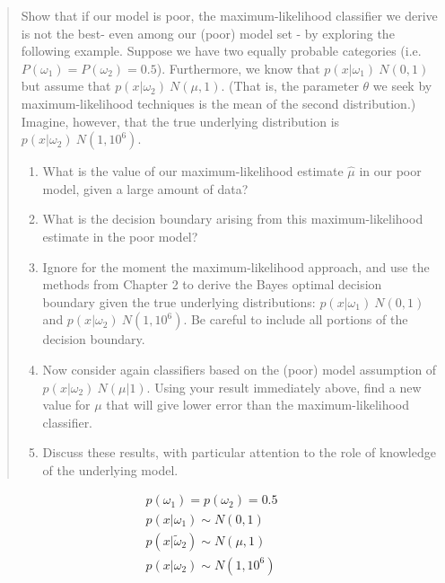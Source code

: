 \documentclass[11pt]{article}
\begin{document}
\begin{quote}
Show that if our model is poor, the maximum-likelihood classifier we derive is not the best- even among our (poor) model set - by exploring the following example.  Suppose we have two equally probable categories (i.e. $P(\omega_1) = P(\omega_2) = 0.5$).  Furthermore, we know that $p(x | \omega_1) ~ N(0,1)$ but assume that $p(x |\omega_2) ~ N(\mu , 1)$.  (That is, the parameter $\theta$ we seek by maximum-likelihood techniques is the mean of the second distribution.)  Imagine, however, that the true underlying distribution is $p(x| \omega_2) ~N(1, 10^6)$.
\begin{enumerate}
	\item What is the value of our maximum-likelihood estimate $\hat{\mu}$ in our poor model, given a large amount of data?
	\item What is the decision boundary arising from this maximum-likelihood estimate in the poor model?  
	\item Ignore for the moment the maximum-likelihood approach, and use the methods from Chapter 2 to derive the Bayes optimal decision boundary given the true underlying distributions: $p(x|\omega_1) ~ N(0,1 )$ and $p(x | \omega_2) ~N(1, 10^6)$.  Be careful to include all portions of the decision boundary.  
	\item Now consider again classifiers based on the (poor) model assumption of $p(x | \omega_2) ~ N(\mu | 1)$.  Using your result immediately above, find  a new value for $\mu$ that will give lower error than the maximum-likelihood classifier.  
	\item Discuss these results, with particular attention to the role of knowledge of the underlying model.  
\end{enumerate}

\end{quote}

\begin{eqnarray}
	p(\omega_1) = p(\omega_2) = 0.5 \\
	p(x | \omega_1) \sim N(0,1) \\
	 p(x | \tilde \omega_2) \sim N ( \mu , 1) \\
	p(x | \omega_2) \sim N(1, 10^6)
\end{eqnarray}
\end{document}
